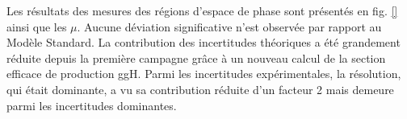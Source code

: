 Les résultats des mesures des régions d'espace de phase sont présentés en fig. \ref{} ainsi que les $\mu$.
Aucune déviation significative n'est observée par rapport au Modèle Standard.
La contribution des incertitudes théoriques a été grandement réduite depuis la première campagne grâce à un nouveau calcul de la section efficace de production ggH.
Parmi les incertitudes expérimentales, la résolution, qui était dominante, a vu sa contribution réduite d'un facteur 2 mais demeure parmi les incertitudes dominantes.
